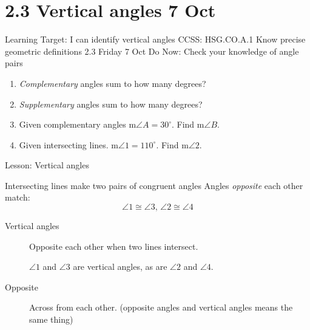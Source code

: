 \documentclass[onlytextwidth]{beamer}
\begin{document}
\section{2.3 Vertical angles \hfill 7 Oct}
\begin{frame}{Learning Target: I can identify vertical angles}
  {CCSS: HSG.CO.A.1 Know precise geometric definitions  \hfill \alert{2.3 Friday 7 Oct}}
    Do Now: Check your knowledge of angle pairs
      \begin{enumerate}
        \item \emph{Complementary} angles sum to how many degrees?
        \item \emph{Supplementary} angles sum to how many degrees?
        \item Given complementary angles m$\angle A= 30^\circ$. Find m$\angle B$.
        \item Given intersecting lines. m$\angle 1 = 110^\circ$. Find m$\angle 2$. \medskip
          \begin{flushright}
          \end{flushright}
      \end{enumerate}
    Lesson: Vertical angles
  \end{frame}

\begin{frame}{Intersecting lines make two pairs of congruent angles}
  Angles \emph{opposite} each other match: 
    $$\angle 1 \cong \angle 3 \text{, } \angle 2 \cong \angle 4$$
  \begin{center}
  \end{center}
\begin{description}
  \item[Vertical angles] Opposite each other when two lines intersect. \par 
    $\angle 1$ and $\angle 3$ are vertical angles, as are $\angle 2$ and $\angle 4$.
  \item[Opposite] Across from each other. (opposite angles and vertical angles means the same thing)
\end{description}
\end{frame}
\end{document}
